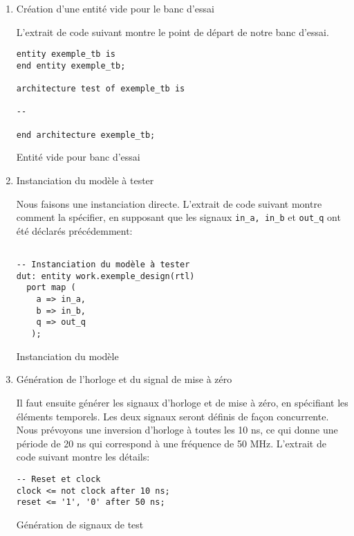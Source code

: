 \documentclass[letter, oneside]{book}
\begin{document}
\begin{enumerate}
\item Création d'une entité vide pour le banc d'essai
\label{sec:orgff09153}

L'extrait de code suivant montre le point de départ de notre banc
d'essai.

\begin{listing}[htbp]
\begin{verbatim}
entity exemple_tb is
end entity exemple_tb;

architecture test of exemple_tb is

--

end architecture exemple_tb;
\end{verbatim}
\caption{Entité vide pour banc d'essai}
\end{listing}

\item Instanciation du modèle à tester
\label{sec:orgf0c620d}

Nous faisons une instanciation directe. L'extrait de code suivant
montre comment la spécifier, en supposant que les signaux \texttt{in\_a, in\_b}
et \texttt{out\_q} ont été déclarés précédemment:

\begin{listing}[htbp]
\begin{verbatim}

-- Instanciation du modèle à tester 
dut: entity work.exemple_design(rtl)
  port map (
    a => in_a,
    b => in_b,
    q => out_q
   );

\end{verbatim}
\caption{Instanciation du modèle}
\end{listing}

\item Génération de l'horloge et du signal de mise à zéro
\label{sec:orgd89dedf}

Il faut ensuite générer les signaux d'horloge et de mise à zéro, en
spécifiant les éléments temporels. Les deux signaux seront définis de
façon concurrente. Nous prévoyons une inversion d'horloge à toutes les
10 ns, ce qui donne une période de 20 ns qui correspond à une
fréquence de 50 MHz. L'extrait de code suivant montre les détails:

\begin{listing}[htbp]
\begin{verbatim}
-- Reset et clock
clock <= not clock after 10 ns;
reset <= '1', '0' after 50 ns;
\end{verbatim}
\caption{Génération de signaux de test}
\end{listing}


\end{enumerate}
\end{document}
